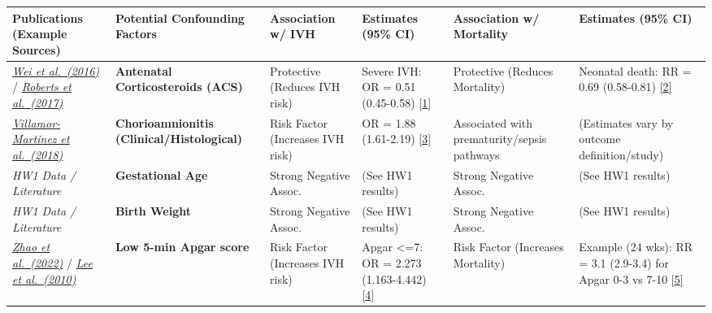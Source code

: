 \documentclass[
]{article}
\begin{document}
\begin{longtable}[]{@{}
  >{\raggedright\arraybackslash}p{}
  >{\raggedright\arraybackslash}p{}
  >{\raggedright\arraybackslash}p{}
  >{\raggedright\arraybackslash}p{}
  >{\raggedright\arraybackslash}p{}
  >{\raggedright\arraybackslash}p{}@{}}
\toprule
Publications (Example Sources) & Potential Confounding Factors &
Association w/ IVH & Estimates (95\% CI) & Association w/ Mortality &
Estimates (95\% CI) \\
\midrule
\endhead
\href{https://doi.org/10.1038/jp.2016.38}{\emph{Wei et al.~(2016)}} /
\href{https://doi.org/10.1002/14651858.CD004454.pub3}{\emph{Roberts et
al.~(2017)}} & \textbf{Antenatal Corticosteroids (ACS)} & Protective
(Reduces IVH risk) & Severe IVH: OR = 0.51 (0.45-0.58)
\href{https://doi.org/10.1038/jp.2016.38}{{[}1{]}} & Protective (Reduces
Mortality) & Neonatal death: RR = 0.69 (0.58-0.81)
\href{https://doi.org/10.1002/14651858.CD004454.pub3}{{[}2{]}} \\
\href{https://doi.org/10.3389/fphys.2018.01253}{\emph{Villamor-Martinez
et al.~(2018)}} & \textbf{Chorioamnionitis (Clinical/Histological)} &
Risk Factor (Increases IVH risk) & OR = 1.88 (1.61-2.19)
\href{https://doi.org/10.3389/fphys.2018.01253}{{[}3{]}} & Associated
with prematurity/sepsis pathways & (Estimates vary by outcome
definition/study) \\
\emph{HW1 Data / Literature} & \textbf{Gestational Age} & Strong
Negative Assoc. & (See HW1 results) & Strong Negative Assoc. & (See HW1
results) \\
\emph{HW1 Data / Literature} & \textbf{Birth Weight} & Strong Negative
Assoc. & (See HW1 results) & Strong Negative Assoc. & (See HW1
results) \\
\href{https://doi.org/10.1186/s12884-022-05245-2}{\emph{Zhao et
al.~(2022)}} /
\href{https://doi.org/10.1111/j.1651-2227.2010.01935.x}{\emph{Lee et
al.~(2010)}} & \textbf{Low 5-min Apgar score} & Risk Factor (Increases
IVH risk) & Apgar \textless=7: OR = 2.273 (1.163-4.442)
\href{https://doi.org/10.1186/s12884-022-05245-2}{{[}4{]}} & Risk Factor
(Increases Mortality) & Example (24 wks): RR = 3.1 (2.9-3.4) for Apgar
0-3 vs 7-10
\href{https://doi.org/10.1111/j.1651-2227.2010.01935.x}{{[}5{]}} \\
\bottomrule
\end{longtable}
\end{document}
